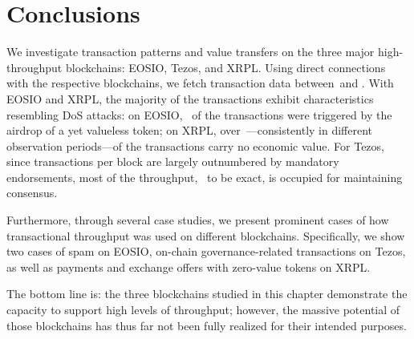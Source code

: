 \section{Conclusions}
\label{sec:4:conclusion}

We investigate transaction patterns and value transfers on the three major high-throughput blockchains: EOSIO, Tezos, and XRPL. 
Using direct connections with the respective blockchains, we fetch transaction data between~\startdate and \finishdate.
With EOSIO and XRPL, the majority of the transactions exhibit characteristics resembling DoS attacks: on EOSIO,~ of the transactions were triggered by the airdrop of a yet valueless token; on XRPL, over~---consistently in different observation periods---of the transactions carry no economic value. 
For Tezos, since transactions per block are largely outnumbered by mandatory endorsements, most of the throughput,~ to be exact, is occupied for maintaining consensus.

Furthermore, through several case studies, we present prominent cases of how transactional throughput was used on different blockchains.
Specifically, we show two cases of spam on EOSIO, on-chain governance-related transactions on Tezos, as well as payments and exchange offers with zero-value tokens on XRPL.

The bottom line is: the three blockchains studied in this chapter demonstrate the capacity to support high levels of throughput; however, the massive potential of those blockchains has thus far not been fully realized for their intended purposes.
